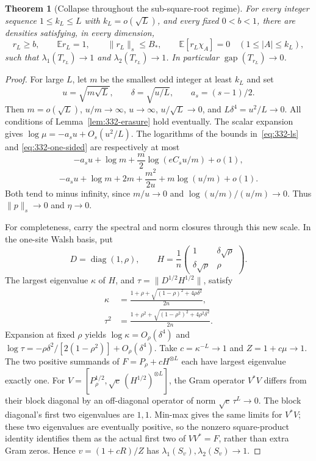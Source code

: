 \documentclass[11pt]{article}
\newtheorem{theorem}{Theorem}
\newcommand{\diag}{\operatorname{diag}}
\newcommand{\gap}{\operatorname{gap}}
\begin{document}
\begin{theorem}[Collapse throughout the sub-square-root regime]
\leavevmode\par
\label{thm:332-subroot}
For every integer sequence $1\le k_L\le L$ with $k_L=o(\sqrt L)$,
and every fixed $0<b<1$, there are densities satisfying, in every dimension,
\[
 r_L\ge b,\qquad \mathbb E r_L=1,\qquad \|r_L\|_s\le B_* ,
 \qquad \mathbb E[r_L\chi_A]=0\quad(1\le|A|\le k_L),
\]
such that $\lambda_1(T_{r_L})\to1$ and $\lambda_2(T_{r_L})\to1$.
In particular $\gap(T_{r_L})\to0$.
\end{theorem}
\begin{proof}
For large $L$, let $m$ be the smallest odd integer at least $k_L$ and set
\[
 u=\sqrt{m\sqrt L},\qquad \delta=\sqrt{u/L},\qquad a_s=(s-1)/2.
\]
Then $m=o(\sqrt L)$, $u/m\to\infty$, $u\to\infty$,
$u/\sqrt L\to0$, and $L\delta^4=u^2/L\to0$.
All conditions of Lemma~\ref{lem:332-erasure} hold eventually.
The scalar expansion gives $\log\mu=-a_su+O_s(u^2/L)$.
The logarithms of the bounds in~\eqref{eq:332-ls} and
\eqref{eq:332-one-sided} are respectively at most
\[
 -a_su+\log m+\frac m2\log(eC_su/m)+o(1),
\]
\[
 -a_su+\log m+2m+\frac{m^2}{2u}+m\log(u/m)+o(1).
\]
Both tend to minus infinity, since $m/u\to0$ and
$\log(u/m)/(u/m)\to0$. Thus $\|p\|_s\to0$ and $\eta\to0$.

For completeness, carry the spectral and norm closures through this
new scale. In the one-site Walsh basis, put
\[
 D=\diag(1,\rho),\qquad
 H=\frac1n\begin{pmatrix}1&\delta\sqrt\rho\\
                         \delta\sqrt\rho&\rho\end{pmatrix}.
\]
The largest eigenvalue $\kappa$ of $H$, and
$\tau=\|D^{1/2}H^{1/2}\|$, satisfy
\begin{align}
 \kappa&=\frac{1+\rho+\sqrt{(1-\rho)^2+4\rho\delta^2}}{2n},
       \label{eq:332-kappa}\\
 \tau^2&=\frac{1+\rho^2+\sqrt{(1-\rho^2)^2+4\rho^2\delta^2}}{2n}.
       \label{eq:332-tau}
\end{align}
Expansion at fixed $\rho$ yields
$\log\kappa=O_\rho(\delta^4)$ and
$\log\tau=-\rho\delta^2/[2(1-\rho^2)]+O_\rho(\delta^4)$.
Take $c=\kappa^{-L}\to1$ and $Z=1+c\mu\to1$.
The two positive summands of $F=P_\rho+cH^{\otimes L}$ each have
largest eigenvalue exactly one. For
$V=[P_\rho^{1/2},\sqrt c\,(H^{1/2})^{\otimes L}]$, the Gram operator
$V^*V$ differs from their block diagonal by an off-diagonal operator
of norm $\sqrt c\,\tau^L\to0$. The block diagonal's first two
eigenvalues are $1,1$. Min-max gives the same limits for $V^*V$;
these two eigenvalues are eventually positive, so the nonzero
square-product identity identifies them as the actual first two
of $VV^*=F$, rather than extra Gram zeros. Hence
$v=(1+cR)/Z$ has $\lambda_1(S_v),\lambda_2(S_v)\to1$.


\end{proof}
\end{document}
